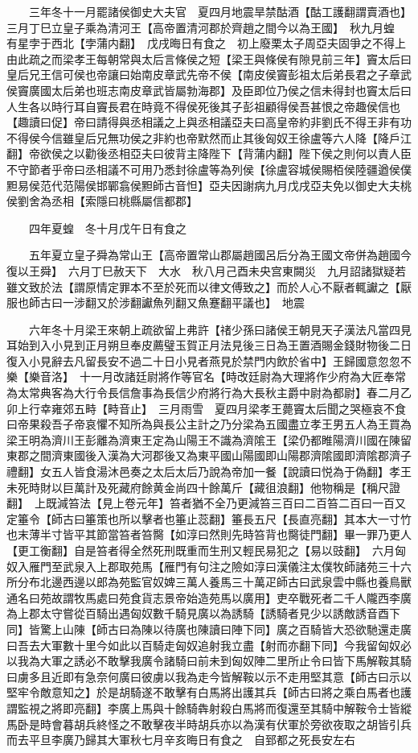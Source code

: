 　　三年冬十一月罷諸侯御史大夫官　夏四月地震旱禁酤酒【酤工護翻謂賣酒也】　三月丁巳立皇子乘為清河王【高帝置清河郡於齊趙之間今以為王國】　秋九月蝗　有星孛于西北【孛蒲内翻】　戊戌晦日有食之　初上廢栗太子周亞夫固爭之不得上由此疏之而梁孝王每朝常與太后言條侯之短【梁王與條侯有隙見前三年】竇太后曰皇后兄王信可侯也帝讓曰始南皮章武先帝不侯【南皮侯竇彭祖太后弟長君之子章武侯竇廣國太后弟也班志南皮章武皆屬勃海郡】及臣即位乃侯之信未得封也竇太后曰人生各以時行耳自竇長君在時竟不得侯死後其子彭祖顧得侯吾甚恨之帝趣侯信也【趣讀曰促】帝曰請得與丞相議之上與丞相議亞夫曰高皇帝約非劉氏不得王非有功不得侯今信雖皇后兄無功侯之非約也帝默然而止其後匈奴王徐盧等六人降【降戶江翻】帝欲侯之以勸後丞相亞夫曰彼背主降陛下【背蒲内翻】陛下侯之則何以責人臣不守節者乎帝曰丞相議不可用乃悉封徐盧等為列侯【徐盧容城侯賜栢侯陸疆遒侯僕䵣易侯范代范陽侯邯鄲翕侯䵣師古音怛】亞夫因謝病九月戊戌亞夫免以御史大夫桃侯劉舍為丞相【索隱曰桃縣屬信都郡】

　　四年夏蝗　冬十月戊午日有食之

　　五年夏立皇子舜為常山王【高帝置常山郡屬趙國呂后分為王國文帝併為趙國今復以王舜】　六月丁巳赦天下　大水　秋八月己酉未央宫東闕災　九月詔諸獄疑若雖文致於法【謂原情定罪本不至於死而以律文傅致之】而於人心不厭者輒讞之【厭服也師古曰一涉翻又於涉翻讞魚列翻又魚蹇翻平議也】　地震

　　六年冬十月梁王來朝上疏欲留上弗許【禇少孫曰諸侯王朝見天子漢法凡當四見耳始到入小見到正月朔旦奉皮薦璧玉賀正月法見後三日為王置酒賜金錢財物後二日復入小見辭去凡留長安不過二十日小見者燕見於禁門内飲於省中】王歸國意忽忽不樂【樂音洛】　十一月改諸廷尉將作等官名【時改廷尉為大理將作少府為大匠奉常為太常典客為大行令長信詹事為長信少府將行為大長秋主爵中尉為都尉】春二月乙卯上行幸雍郊五畤【畤音止】　三月雨雪　夏四月梁孝王薨竇太后聞之哭極哀不食曰帝果殺吾子帝哀懼不知所為與長公主計之乃分梁為五國盡立孝王男五人為王買為梁王明為濟川王彭離為濟東王定為山陽王不識為濟隂王【梁仍都睢陽濟川國在陳留東郡之間濟東國後入漢為大河郡後又為東平國山陽國即山陽郡濟隂國即濟隂郡濟子禮翻】女五人皆食湯沐邑奏之太后太后乃說為帝加一餐【說讀曰悦為于偽翻】孝王未死時財以巨萬計及死藏府餘黄金尚四十餘萬斤【藏徂浪翻】他物稱是【稱尺證翻】　上既減笞法【見上卷元年】笞者猶不全乃更減笞三百曰二百笞二百曰一百又定箠令【師古曰箠策也所以擊者也箠止蕊翻】箠長五尺【長直亮翻】其本大一寸竹也末薄半寸皆平其節當笞者笞臋【如淳曰然則先時笞背也臋徒門翻】畢一罪乃更人【更工衡翻】自是笞者得全然死刑既重而生刑又輕民易犯之【易以豉翻】　六月匈奴入雁門至武泉入上郡取苑馬【雁門有句注之險如淳曰漢儀注太僕牧師諸苑三十六所分布北邊西邊以郎為苑監官奴婢三萬人養馬三十萬疋師古曰武泉雲中縣也養鳥獸通名曰苑故謂牧馬處曰苑食貨志景帝始造苑馬以廣用】吏卒戰死者二千人隴西李廣為上郡太守嘗從百騎出遇匈奴數千騎見廣以為誘騎【誘騎者見少以誘敵誘音酉下同】皆驚上山陳【師古曰為陳以待廣也陳讀曰陣下同】廣之百騎皆大恐欲馳還走廣曰吾去大軍數十里今如此以百騎走匈奴追射我立盡【射而亦翻下同】今我留匈奴必以我為大軍之誘必不敢擊我廣令諸騎曰前未到匈奴陣二里所止令曰皆下馬解鞍其騎曰虜多且近即有急奈何廣曰彼虜以我為走今皆解鞍以示不走用堅其意【師古曰示以堅牢令敵意知之】於是胡騎遂不敢擊有白馬將出護其兵【師古曰將之乘白馬者也護謂監視之將即亮翻】李廣上馬與十餘騎犇射殺白馬將而復還至其騎中解鞍令士皆縱馬卧是時會暮胡兵終怪之不敢擊夜半時胡兵亦以為漢有伏軍於旁欲夜取之胡皆引兵而去平旦李廣乃歸其大軍秋七月辛亥晦日有食之　自郅都之死長安左右

